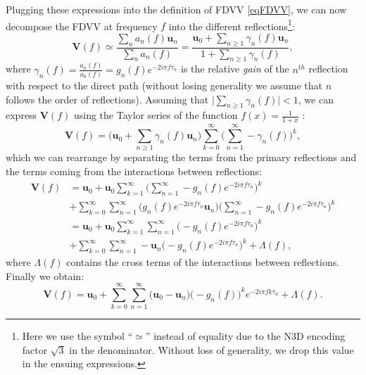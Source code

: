 Plugging these expressions into the definition of FDVV \eqref{eqFDVV}, we can now decompose the FDVV at frequency $f$ into the different reflections\footnote{Here we use the symbol ``$\simeq$'' instead of equality due to the N3D encoding factor $\sqrt{3}$ in the denominator. Without loss of generality, we drop this value in the ensuing expressions.}:
\begin{equation}
    \mathbf{V}(f) \simeq \frac{\sum_n a_n(f) \mathbf{u}_n}{\sum_n a_n(f)} = \frac{\mathbf{u}_0 + \sum_{n \geq 1} \gamma_n(f) \mathbf{u}_n}{1+\sum_{n \geq 1} \gamma_n(f)},
\end{equation}
where $\gamma_n(f) = \frac{a_n(f)}{a_0(f)} = g_n(f) e^{-2i \pi f \tau_n}$ is the relative \emph{gain} of the $n^{th}$ reflection with respect to the direct path (without losing generality we assume that $n$ follows the order of reflections).
Assuming that $\lvert \sum_{n \geq 1} \gamma_n(f) \rvert < 1$, we can express $\mathbf{V}(f)$ using the Taylor series of the function $f(x) = \frac{1}{1+x}$ :
\begin{equation}
    \mathbf{V}(f) = \Big(\mathbf{u}_0 + \sum_{n \geq 1} \gamma_n(f) \mathbf{u}_n \Big) \sum_{k=0}^{\infty} \Big( \sum_{n = 1}^{\infty} - \gamma_n(f) \Big)^k,
\end{equation}
which we can rearrange by separating the terms from the primary reflections and the terms coming from the interactions between reflections:
\begin{equation}
\begin{aligned}
        \mathbf{V}(f) &= \mathbf{u}_0 + \mathbf{u}_0 \sum_{k=1}^{\infty} \Big( \sum_{n=1}^{\infty} -g_n(f) e^{-2i \pi f \tau_n} \Big)^k \\
                      &+ \sum_{k=0}^{\infty} \sum_{n=1}^{\infty} \Big(g_n(f) e^{-2i \pi f \tau_n} \mathbf{u}_n \Big) \Big( \sum_{n=1}^{\infty} -g_n(f) e^{-2i \pi f \tau_n} \Big)^k \\
                      &= \mathbf{u}_0 + \mathbf{u}_0 \sum_{k=1}^{\infty} \sum_{n=1}^{\infty} \Big( -g_n(f) e^{-2i \pi f \tau_n} \Big)^k \\
                      &+ \sum_{k=0}^{\infty} \sum_{n=1}^{\infty} - \mathbf{u}_n  \Big( -g_n(f) e^{-2i \pi f \tau_n} \Big)^k + \Lambda(f),
\end{aligned}
\end{equation}
where $\Lambda(f)$ contains the cross terms of the interactions between reflections. Finally we obtain:
\begin{equation}
    \mathbf{V}(f) = \mathbf{u}_0 + \sum_{k=0}^{\infty} \sum_{n=1}^{\infty} \Big(\mathbf{u}_0 - \mathbf{u}_n \Big) \Big(-g_n(f)\Big)^k e^{-2i \pi f k \tau_n} + \Lambda(f).
\end{equation}

